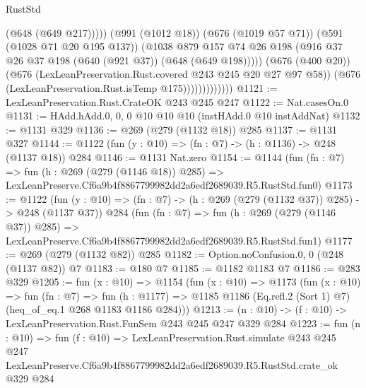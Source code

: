 \begin{lexlean}{RustStd}
\begin{coremodule}
                                  (@648 (@649 @217)))))
                            (@991 (@1012 @18))
                            (@676 (@1019 @57 @71))
                            (@591 (@1028 @71 @20 @195 @137))
                            (@1038
                              @879
                              @157
                              @74
                              @26
                              @198
                              (@916 @37 @26 @37 @198 (@640 (@921 @37)) (@648 (@649 @198)))))
                          (@676 (@400 @20))
                          (@676 (LexLeanPreservation.Rust.covered @243 @245 @20 @27 @97 @58))
                          (@676 (LexLeanPreservation.Rust.isTemp @175)))))))))))))
@1121 := LexLeanPreservation.Rust.CrateOK @243 @245 @247
@1122 := Nat.casesOn.{0}
@1131 := HAdd.hAdd.{0, 0, 0} @10 @10 @10 (instHAdd.{0} @10 instAddNat)
@1132 := @1131 @329
@1136 := @269 (@279 (@1132 @18)) @285
@1137 := @1131 @327
@1144 := @1122 (fun (y : @10) => (fn : @7) -> (h : @1136) -> @248 (@1137 @18)) @284
@1146 := @1131 Nat.zero
@1154 := @1144
    (fun (fn : @7) =>
    fun (h : @269 (@279 (@1146 @18)) @285) =>
    LexLeanPreserve.Cf6a9b4f8867799982dd2a6edf2689039.R5.RustStd.fun0)
@1173 := @1122
    (fun (y : @10) => (fn : @7) -> (h : @269 (@279 (@1132 @37)) @285) -> @248 (@1137 @37))
    @284
    (fun (fn : @7) =>
    fun (h : @269 (@279 (@1146 @37)) @285) =>
    LexLeanPreserve.Cf6a9b4f8867799982dd2a6edf2689039.R5.RustStd.fun1)
@1177 := @269 (@279 (@1132 @82)) @285
@1182 := Option.noConfusion.{0, 0} (@248 (@1137 @82)) @7
@1183 := @180 @7
@1185 := @1182 @1183 @7
@1186 := @283 @329
@1205 := fun (x : @10) =>
  @1154
    (fun (x : @10) =>
    @1173
      (fun (x : @10) =>
      fun (fn : @7) =>
      fun (h : @1177) =>
      @1185 @1186 (Eq.refl.{2} (Sort 1) @7) (heq_of_eq.{1} @268 @1183 @1186 @284)))
@1213 := (n : @10) -> (f : @10) -> LexLeanPreservation.Rust.FunSem @243 @245 @247 @329 @284
@1223 := fun (n : @10) =>
  fun (f : @10) =>
  LexLeanPreservation.Rust.simulate
    @243
    @245
    @247
    LexLeanPreserve.Cf6a9b4f8867799982dd2a6edf2689039.R5.RustStd.crate_ok
    @329
    @284
\end{coremodule}
\end{lexlean}
